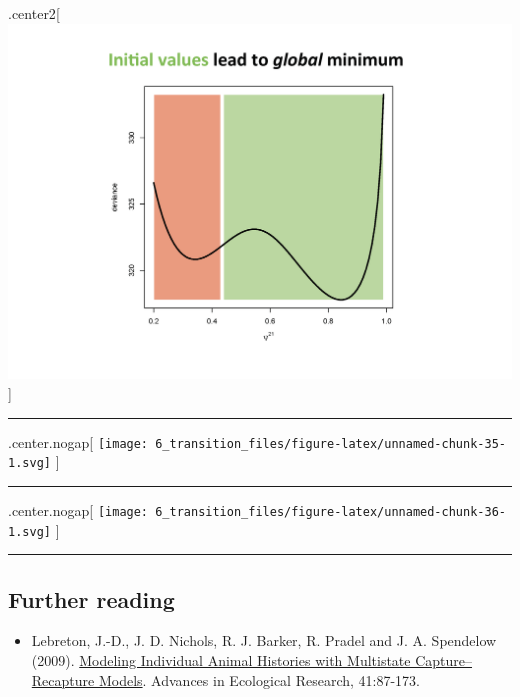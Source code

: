 \documentclass[
]{article}
\providecommand{\tightlist}{%
  \setlength{\itemsep}{0pt}\setlength{\parskip}{0pt}}
\begin{document}
.center2{[}
\includegraphics{img/multistate_local_minimav2_Page_07.png}{]}

\begin{center}\rule{0.5\linewidth}{0.5pt}\end{center}

.center.nogap{[}
\texttt{[image: 6\_transition\_files/figure-latex/unnamed-chunk-35-1.svg]}
{]}

\begin{center}\rule{0.5\linewidth}{0.5pt}\end{center}

.center.nogap{[}
\texttt{[image: 6\_transition\_files/figure-latex/unnamed-chunk-36-1.svg]}
{]}

\begin{center}\rule{0.5\linewidth}{0.5pt}\end{center}

\hypertarget{further-reading}{%
\subsection{Further reading}\label{further-reading}}

\begin{itemize}
\tightlist
\item
  Lebreton, J.-D., J. D. Nichols, R. J. Barker, R. Pradel and J. A.
  Spendelow (2009).
  \href{https://multievent.sciencesconf.org/conference/multievent/pages/Lebretonetal2009AER.pdf}{Modeling
  Individual Animal Histories with Multistate Capture--Recapture
  Models}. Advances in Ecological Research, 41:87-173.
\end{itemize}
\end{document}
